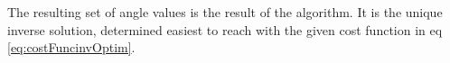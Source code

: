 The resulting set of angle values is the result of the algorithm. It is the unique inverse solution, determined easiest to reach with the given cost function in eq \ref{eq:costFuncinvOptim}. 






%
